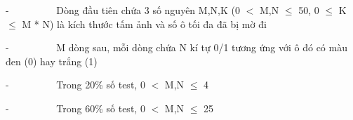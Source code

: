 -          Dòng đầu tiên chứa 3 số nguyên M,N,K (0 $<$ M,N  $\le$  50, 0  $\le$  K  $\le$  M * N) là kích thước tấm ảnh và số ô tối đa đã bị mờ đi

-          M dòng sau, mỗi dòng chứa N kí tự 0/1 tương ứng với ô đó có màu đen (0) hay trắng (1)

-          Trong 20\% số test, 0 $<$ M,N  $\le$  4

-          Trong 60\% số test, 0 $<$ M,N  $\le$  25